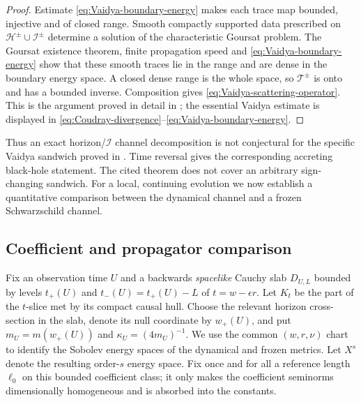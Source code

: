 \documentclass[11pt,a4paper]{article}
\theoremstyle{definition}
\theoremstyle{remark}
\newcommand{\scrI}{\mathscr I}
\newcommand{\HH}{\mathcal H}
\begin{document}
	\begin{proof}
		Estimate \eqref{eq:Vaidya-boundary-energy} makes each trace map bounded,
		injective and of closed range.  Smooth compactly supported data prescribed on
		$\HH^\pm\cup\scrI^\pm$ determine a solution of the characteristic Goursat
		problem.  The Goursat existence theorem, finite propagation speed and
		\eqref{eq:Vaidya-boundary-energy} show that these smooth traces lie in the
		range and are dense in the boundary energy space.  A closed dense range is the
		whole space, so $\mathcal T^\pm$ is onto and has a bounded inverse.  Composition
		gives \eqref{eq:Vaidya-scattering-operator}.  This is the argument proved in
		detail in \cite{Coudray2024}; the essential Vaidya estimate is displayed in
		\eqref{eq:Coudray-divergence}--\eqref{eq:Vaidya-boundary-energy}.
	\end{proof}
	
	Thus an exact horizon/$\scrI$ channel decomposition is not conjectural for the
	specific Vaidya sandwich proved in \cite{Coudray2024}.  Time reversal gives
	the corresponding accreting black-hole statement.  The cited theorem does
	not cover an arbitrary sign-changing sandwich.  For a local, continuing
	evolution we now establish a
	quantitative comparison between the dynamical channel and a frozen
	Schwarzschild channel.
	
	\subsection{Coefficient and propagator comparison}
	
	Fix an observation time $U$ and a backwards \emph{spacelike} Cauchy slab
	$D_{U,L}$ bounded by levels $t_+(U)$ and $t_-(U)=t_+(U)-L$ of
	$t=w-\epsilon r$.  Let $K_t$ be the part of the $t$-slice met by its compact
	causal hull.  Choose the relevant horizon cross-section in the slab, denote
	its null coordinate by $w_+(U)$, and put
	$m_U=m(w_+(U))$ and $\kappa_U=(4m_U)^{-1}$.  We use the common
	$(w,r,\nu)$ chart to identify the Sobolev energy spaces of the dynamical and
	frozen metrics.  Let $X^s$ denote the resulting order-$s$ energy space.
	Fix once and for all a reference length $\ell_0$ on this bounded coefficient
	class; it only makes the coefficient seminorms dimensionally homogeneous and
	is absorbed into the constants.
	
\end{document}
